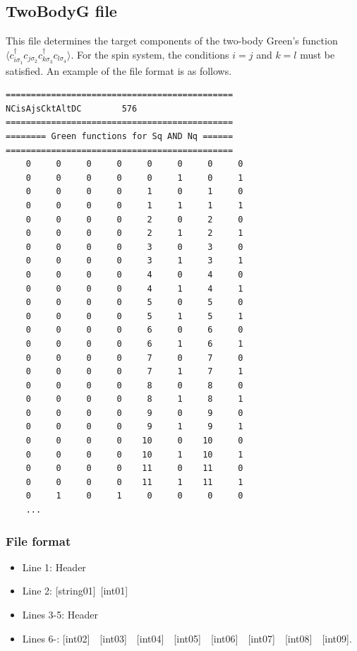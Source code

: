 \newpage
\subsection{TwoBodyG file}
\label{Subsec:twobodyg}
This file determines the target components of the two-body Green's function $\langle c_{i\sigma_1}^{\dagger}c_{j\sigma_2}c_{k\sigma_3}^{\dagger}c_{l\sigma_4}\rangle$. {For the spin system, the conditions $i=j$ and $k=l$ must be satisfied.}
An example of the file format is as follows.

\begin{minipage}{12.5cm}
\begin{screen}
\begin{verbatim}
=============================================
NCisAjsCktAltDC        576
=============================================
======== Green functions for Sq AND Nq ======
=============================================
    0     0     0     0     0     0     0     0
    0     0     0     0     0     1     0     1
    0     0     0     0     1     0     1     0
    0     0     0     0     1     1     1     1
    0     0     0     0     2     0     2     0
    0     0     0     0     2     1     2     1
    0     0     0     0     3     0     3     0
    0     0     0     0     3     1     3     1
    0     0     0     0     4     0     4     0
    0     0     0     0     4     1     4     1
    0     0     0     0     5     0     5     0
    0     0     0     0     5     1     5     1
    0     0     0     0     6     0     6     0
    0     0     0     0     6     1     6     1
    0     0     0     0     7     0     7     0
    0     0     0     0     7     1     7     1
    0     0     0     0     8     0     8     0
    0     0     0     0     8     1     8     1
    0     0     0     0     9     0     9     0
    0     0     0     0     9     1     9     1
    0     0     0     0    10     0    10     0
    0     0     0     0    10     1    10     1
    0     0     0     0    11     0    11     0
    0     0     0     0    11     1    11     1
    0     1     0     1     0     0     0     0
    ...
\end{verbatim}
\end{screen}
\end{minipage}

\subsubsection{File format}
 \begin{itemize}
   \item  Line 1:  Header
   \item  Line 2:   [string01]~[int01]
   \item  Lines 3-5:  Header
   \item  Lines 6-: 
   [int02]~~[int03]~~[int04]~~[int05]~~[int06]~~[int07]~~[int08]~~[int09].
  \end{itemize}

